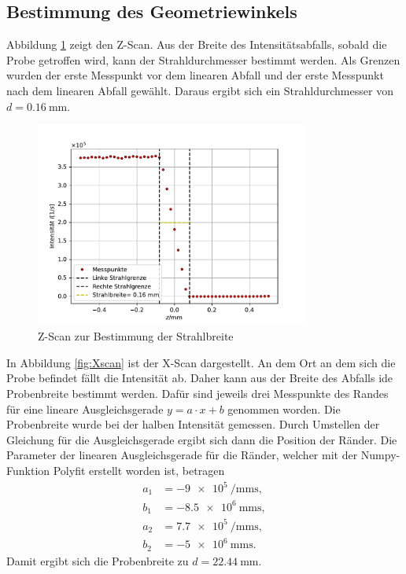 \subsection{Bestimmung des Geometriewinkels}
Abbildung \ref{fig:Zscan} zeigt den Z-Scan. Aus der Breite des Intensitätsabfalls, sobald die Probe getroffen wird, 
kann der Strahldurchmesser bestimmt werden. 
Als Grenzen wurden der erste Messpunkt vor dem linearen Abfall und der erste Messpunkt nach dem linearen Abfall gewählt. 
Daraus ergibt sich ein Strahldurchmesser von $d=\SI{0.16}{\milli\meter}$.
\begin{figure}[H]
    \centering
    \includegraphics[width=0.8\textwidth]{plots/Zscan.pdf}
    \caption{Z-Scan zur Bestimmung der Strahlbreite}
    \label{fig:Zscan}
\end{figure}
In Abbildung \ref{fig:Xscan} ist der X-Scan dargestellt. An dem Ort an dem sich die Probe befindet fällt die Intensität ab. Daher kann aus der Breite des Abfalls ide Probenbreite 
bestimmt werden. Dafür sind jeweils drei Messpunkte des Randes für eine lineare Ausgleichsgerade $y=a\cdot x+b$ genommen worden. Die Probenbreite wurde bei der halben Intensität gemessen.
Durch Umstellen der Gleichung für die Ausgleichsgerade ergibt sich dann die Position der Ränder. 
Die Parameter der linearen Ausgleichsgerade für die Ränder, welcher mit der Numpy-Funktion Polyfit erstellt worden ist, betragen
\begin{align*}
    a_1 &= \SI{-9e5}{\per\milli\meter\second}, \\
    b_1 &= \SI{-8.5e6}{\milli\meter\second}, \\
    a_2 &= \SI{7.7e5}{\per\milli\meter\second}, \\
    b_2 &= \SI{-5e6}{\milli\meter\second}.
\end{align*}
Damit ergibt sich die Probenbreite zu $d=\SI{22.44}{\milli\meter}$.
